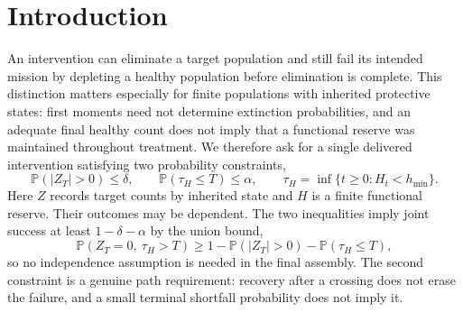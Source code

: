 \documentclass[11pt]{article}
\theoremstyle{remark}\newtheorem{remark}[theorem]{Remark}
\newcommand{\Prob}{\mathbb P}
\newcommand{\1}{\mathbf 1}
\begin{document}
\section{Introduction}\label{sec:intro}
An intervention can eliminate a target population and still fail its intended mission by depleting a healthy population before elimination is complete. This distinction matters especially for finite populations with inherited protective states: first moments need not determine extinction probabilities, and an adequate final healthy count does not imply that a functional reserve was maintained throughout treatment. We therefore ask for a single delivered intervention satisfying two probability constraints,
\begin{equation}\label{eq:mission}
 \Prob(|Z_T|>0)\le\delta,\qquad
 \Prob(\tau_H\le T)\le\alpha,\qquad
 \tau_H=\inf\{t\ge0:H_t<h_{\min}\}.
\end{equation}
Here $Z$ records target counts by inherited state and $H$ is a finite functional reserve. Their outcomes may be dependent. The two inequalities imply joint success at least $1-\delta-\alpha$ by the union bound,
\[
 \Prob(Z_T=0,\ \tau_H>T)\ge1-\Prob(|Z_T|>0)-\Prob(\tau_H\le T),
\]
so no independence assumption is needed in the final assembly. The second constraint is a genuine path requirement: recovery after a crossing does not erase the failure, and a small terminal shortfall probability does not imply it.
\end{document}
